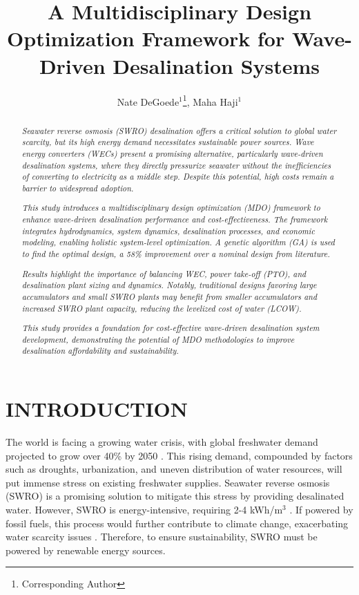 \documentclass[twocolumn,10pt]{asme2e}
\title{ \vspace{-10 mm} A Multidisciplinary Design Optimization Framework for Wave-Driven Desalination Systems}
\author{Nate DeGoede$^1$\thanks{Corresponding Author}, Maha Haji$^1$
    \affiliation{
	$^1$Sibley School of Mechanical and Aerospace Engineering\\
	Cornell University\\
	Ithaca, New York 14853\\
    Email: \{njd76, maha\}@cornell.edu 
    }
}
\begin{document}
\maketitle

\setlength{\abovedisplayskip}{10pt}
\setlength{\belowdisplayskip}{10pt}

\begin{abstract}

\textit{Seawater reverse osmosis (SWRO) desalination offers a critical solution to global water scarcity, but its high energy demand necessitates sustainable power sources. Wave energy converters (WECs) present a promising alternative, particularly wave-driven desalination systems, where they directly pressurize seawater without the inefficiencies of converting to electricity as a middle step. Despite this potential, high costs remain a barrier to widespread adoption.} 

\textit{This study introduces a multidisciplinary design optimization (MDO) framework to enhance wave-driven desalination performance and cost-effectiveness. The framework integrates hydrodynamics, system dynamics, desalination processes, and economic modeling, enabling holistic system-level optimization. A genetic algorithm (GA) is used to find the optimal design, a 58\% improvement over a nominal design from literature.} 

\textit{Results highlight the importance of balancing WEC, power take-off (PTO), and desalination plant sizing and dynamics. Notably, traditional designs favoring large accumulators and small SWRO plants may benefit from smaller accumulators and increased SWRO plant capacity, reducing the levelized cost of water (LCOW).}

\textit{This study provides a foundation for cost-effective wave-driven desalination system development, demonstrating the potential of MDO methodologies to improve desalination affordability and sustainability.}

\end{abstract}


\section{INTRODUCTION}

The world is facing a growing water crisis, with global freshwater demand projected to grow over 40\% by 2050 \cite{watershortage2015}. This rising demand, compounded by factors such as droughts, urbanization, and uneven distribution of water resources, will put immense stress on existing freshwater supplies. Seawater reverse osmosis (SWRO) is a promising solution to mitigate this stress by providing desalinated water. However, SWRO is energy-intensive, requiring 2-4 kWh/m$^3$ \cite{Li2018}. If powered by fossil fuels, this process would further contribute to climate change, exacerbating water scarcity issues \cite{nytdrought}. Therefore, to ensure sustainability, SWRO must be powered by renewable energy sources. 
\end{document}
